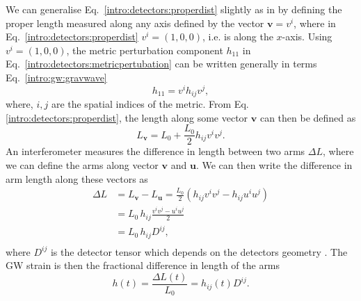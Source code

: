 We can generalise Eq.~\ref{intro:detectors:properdist} slightly as in \citep{whelanGeometryGravitational} by defining the proper length measured along any axis defined by the vector $\bm{v} = v^i$, where in Eq.~\ref{intro:detectors:properdist} $v^i = (1,0,0)$, i.e. is along the $x$-axis.
Using $v^i = (1,0,0)$, the metric perturbation component $h_{11}$ in Eq.~\ref{intro:detectors:metricpertubation} can be written generally in terms Eq.~\ref{intro:gw:gravwave} 
\begin{equation}
    h_{11} = v^i h_{ij} v^j,
\end{equation}
where, $i,j$ are the spatial indices of the metric.
From Eq.\ref{intro:detectors:properdist}, the length along some vector $\bm{v}$ can then be defined as 
\begin{equation}
    L_{\bm{v}} = L_0 + \frac{L_0}{2} h_{ij} v^i v^j.
\end{equation}
An interferometer measures the difference in length between two arms $\Delta L$, where we can define the arms along vector $\bm{v}$ and $\bm{u}$.
We can then write the difference in arm length along these vectors as
\begin{equation}
    \label{intro:detector:lengthdifference}
    \begin{split}
        \Delta L &= L_{\bm{v}} - L_{\bm{u}} = \frac{L_0}{2} \left( h_{ij} v^i v^j - h_{ij}u^i u^j \right) \\
                &= L_0\, h_{ij} \frac{ v^i v^j - u^i u^j }{2}\\
                &= L_0\, h_{ij} D^{ij},\\
    \end{split}
\end{equation}
where $D^{ij}$ is the detector tensor which depends on the detectors geometry \citep{whelanGeometryGravitational}.
The \gls{GW} strain is then the fractional difference in length of the arms
\begin{equation} 
    \label{intro:detectors:strain:detectortensor}
    h(t) = \frac{\Delta L(t)}{ L_0} = h_{ij}(t) D^{ij}.
\end{equation}


